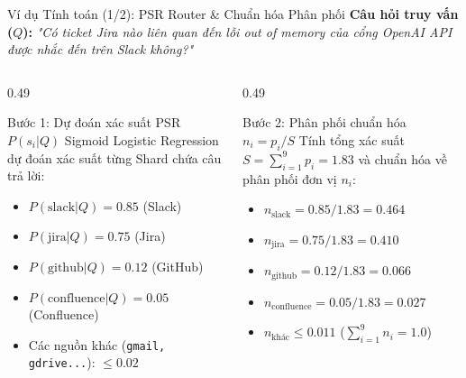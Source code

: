 \documentclass[aspectratio=169,10pt]{beamer}
\begin{document}
\begin{frame}{Ví dụ Tính toán (1/2): PSR Router \& Chuẩn hóa Phân phối}
\small
\textbf{Câu hỏi truy vấn ($Q$):} \textit{"Có ticket Jira nào liên quan đến lỗi out of memory của cổng OpenAI API được nhắc đến trên Slack không?"}

\vspace{0.2cm}
\begin{columns}[T]
\begin{column}{0.49\textwidth}
\begin{block}{Bước 1: Dự đoán xác suất PSR $P(s_i|Q)$}
Sigmoid Logistic Regression dự đoán xác suất từng Shard chứa câu trả lời:
\begin{itemize}
    \item $P(\text{slack}|Q) = \mathbf{0.85}$ (Slack)
    \item $P(\text{jira}|Q) = \mathbf{0.75}$ (Jira)
    \item $P(\text{github}|Q) = 0.12$ (GitHub)
    \item $P(\text{confluence}|Q) = 0.05$ (Confluence)
    \item Các nguồn khác (\texttt{gmail, gdrive...}): $\le 0.02$
\end{itemize}
\end{block}
\end{column}

\begin{column}{0.49\textwidth}
\begin{block}{Bước 2: Phân phối chuẩn hóa $n_i = p_i / S$}
Tính tổng xác suất $S = \sum_{i=1}^9 p_i = \mathbf{1.83}$ và chuẩn hóa về phân phối đơn vị $n_i$:
\begin{itemize}
    \item $n_{\text{slack}} = 0.85 / 1.83 = \mathbf{0.464}$
    \item $n_{\text{jira}} = 0.75 / 1.83 = \mathbf{0.410}$
    \item $n_{\text{github}} = 0.12 / 1.83 = \mathbf{0.066}$
    \item $n_{\text{confluence}} = 0.05 / 1.83 = \mathbf{0.027}$
    \item $n_{\text{khác}} \le 0.011$ ($\sum_{i=1}^9 n_i = 1.0$)
\end{itemize}
\end{block}
\end{column}
\end{columns}
\end{frame}
\end{document}
